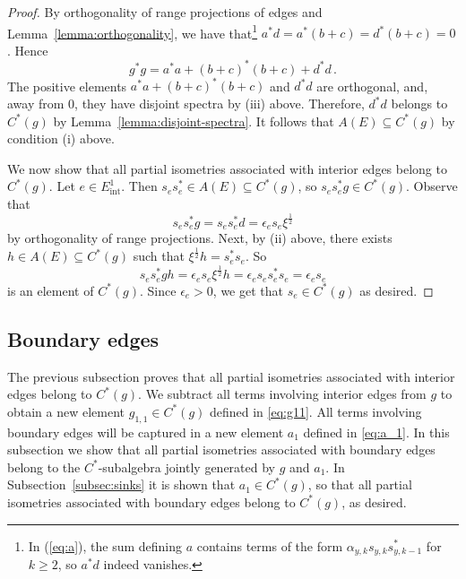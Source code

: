 \documentclass[12pt, a4paper]
{amsart}
\theoremstyle{definition}
\theoremstyle{remark}
\numberwithin{equation}{section}
\newcommand{\edgeint}{E^1_{\mathrm{int}}}
\newcommand{\Cstar}{\ensuremath{C^*}}
\begin{document}
\begin{proof}
    By orthogonality of range projections of edges and Lemma~\ref{lemma:orthogonality}, we have that\footnote{In (\ref{eq:a}), the sum defining $a$ contains terms of the form $\alpha_{y,k}s_{y,k}s^*_{y,k-1}$ for $k \ge 2$, so $a^*d$ indeed vanishes.} ${a^*d = a^*(b+c) = d^*(b+c) = 0}$. Hence
    \begin{equation}
    g^*g = a^*a + (b+c)^*(b+c) + d^*d\,.
    \end{equation}
    The positive elements $a^*a + (b+c)^*(b+c)$ and $d^*d$ are orthogonal, and, away from 0, they have disjoint spectra by (iii) above. Therefore, $d^*d$ belongs to $\Cstar(g)$ by Lemma~\ref{lemma:disjoint-spectra}. It follows that $A(E) \subseteq \Cstar(g)$ by condition (i) above.

    We now show that all partial isometries associated with interior edges belong to $C^*(g)$. Let $e \in \edgeint$. Then $s_e s_e ^* \in A(E) \subseteq \Cstar(g)$, so $s_e s_e^* g \in \Cstar(g)$. Observe that
    \begin{equation}
    s_e s_e^* g = s_e s_e^* d = \epsilon_e s_e \xi^{\frac{1}{2}}
    \end{equation}
    by orthogonality of range projections. Next, by (ii) above, there exists $h \in A(E) \subseteq \Cstar(g)$ such that $\xi^{\frac{1}{2}}h =s_e^*s_e$. So
    \begin{equation}
    s_e s_e^* g h = \epsilon_e s_e \xi^{\frac{1}{2}}h = \epsilon_e s_e s_e^* s_e = \epsilon_e s_e
    \end{equation}
    is an element of $\Cstar(g)$. Since $\epsilon_e >0$, we get that $s_e \in \Cstar(g)$ as desired.
\end{proof}

\subsection{Boundary edges}\label{subsec:boundar}
The previous subsection proves that all partial isometries associated with interior edges belong to $\Cstar(g)$. We subtract all terms involving interior edges from $g$ to obtain a new element $g_{1,1} \in \Cstar(g)$ defined in \eqref{eq:g11}. All terms involving boundary edges will be captured in a new element $a_1$ defined in \eqref{eq:a_1}. In this subsection we show that all partial isometries associated with boundary edges belong to the \Cstar-subalgebra jointly generated by $g$ and $a_1$. In Subsection~\ref{subsec:sinks} it is shown that $a_1 \in \Cstar(g)$, so that all partial isometries associated with boundary edges belong to $\Cstar(g)$, as desired.
\end{document}
